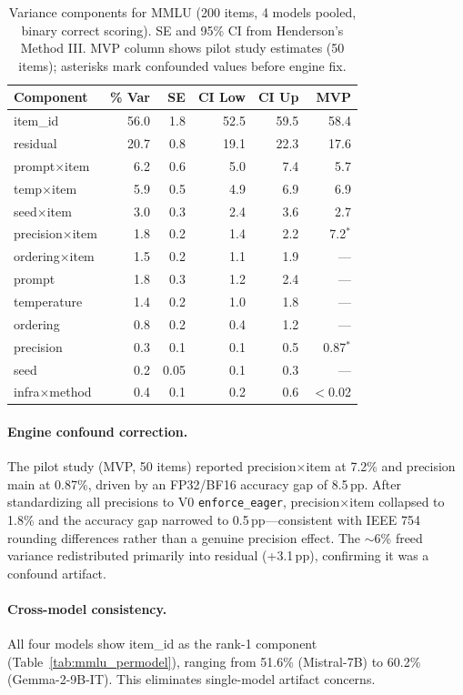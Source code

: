 \documentclass[11pt]{article}
\newcommand{\pp}{\,\text{pp}}
\begin{document}
\begin{table}[t]
\centering
\caption{Variance components for MMLU (200 items, 4 models pooled, binary correct scoring). SE and 95\% CI from Henderson's Method III. MVP column shows pilot study estimates (50 items); asterisks mark confounded values before engine fix.}
\label{tab:mmlu_variance}
\small
\begin{tabular}{lrrrrr}
\toprule
Component & \% Var & SE & CI Low & CI Up & MVP \\
\midrule
item\_id & 56.0 & 1.8 & 52.5 & 59.5 & 58.4 \\
residual & 20.7 & 0.8 & 19.1 & 22.3 & 17.6 \\
prompt$\times$item & 6.2 & 0.6 & 5.0 & 7.4 & 5.7 \\
temp$\times$item & 5.9 & 0.5 & 4.9 & 6.9 & 6.9 \\
seed$\times$item & 3.0 & 0.3 & 2.4 & 3.6 & 2.7 \\
precision$\times$item & 1.8 & 0.2 & 1.4 & 2.2 & 7.2$^*$ \\
ordering$\times$item & 1.5 & 0.2 & 1.1 & 1.9 & --- \\
prompt & 1.8 & 0.3 & 1.2 & 2.4 & --- \\
temperature & 1.4 & 0.2 & 1.0 & 1.8 & --- \\
ordering & 0.8 & 0.2 & 0.4 & 1.2 & --- \\
precision & 0.3 & 0.1 & 0.1 & 0.5 & 0.87$^*$ \\
seed & 0.2 & 0.05 & 0.1 & 0.3 & --- \\
infra$\times$method & 0.4 & 0.1 & 0.2 & 0.6 & $<$0.02 \\
\bottomrule
\end{tabular}
\end{table}

\paragraph{Engine confound correction.}
The pilot study (MVP, 50 items) reported precision$\times$item at 7.2\% and precision main at 0.87\%, driven by an FP32/BF16 accuracy gap of 8.5$\pp$.
After standardizing all precisions to V0 \texttt{enforce\_eager}, precision$\times$item collapsed to 1.8\% and the accuracy gap narrowed to 0.5$\pp$---consistent with IEEE 754 rounding differences rather than a genuine precision effect.
The $\sim$6\% freed variance redistributed primarily into residual (+3.1$\pp$), confirming it was a confound artifact.

\paragraph{Cross-model consistency.}
All four models show item\_id as the rank-1 component (Table~\ref{tab:mmlu_permodel}), ranging from 51.6\% (Mistral-7B) to 60.2\% (Gemma-2-9B-IT). This eliminates single-model artifact concerns.
\end{document}

